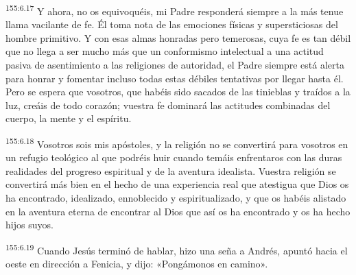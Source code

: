 \par 
\textsuperscript{155:6.17} Y ahora, no os equivoquéis, mi Padre responderá siempre a la más tenue llama vacilante de fe. Él toma nota de las emociones físicas y supersticiosas del hombre primitivo. Y con esas almas honradas pero temerosas, cuya fe es tan débil que no llega a ser mucho más que un conformismo intelectual a una actitud pasiva de asentimiento a las religiones de autoridad, el Padre siempre está alerta para honrar y fomentar incluso todas estas débiles tentativas por llegar hasta él. Pero se espera que vosotros, que habéis sido sacados de las tinieblas y traídos a la luz, creáis de todo corazón; vuestra fe dominará las actitudes combinadas del cuerpo, la mente y el espíritu.

\par 
\textsuperscript{155:6.18} Vosotros sois mis apóstoles, y la religión no se convertirá para vosotros en un refugio teológico al que podréis huir cuando temáis enfrentaros con las duras realidades del progreso espiritual y de la aventura idealista. Vuestra religión se convertirá más bien en el hecho de una experiencia real que atestigua que Dios os ha encontrado, idealizado, ennoblecido y espiritualizado, y que os habéis alistado en la aventura eterna de encontrar al Dios que así os ha encontrado y os ha hecho hijos suyos.

\par 
\textsuperscript{155:6.19} Cuando Jesús terminó de hablar, hizo una seña a Andrés, apuntó hacia el oeste en dirección a Fenicia, y dijo: «Pongámonos en camino».